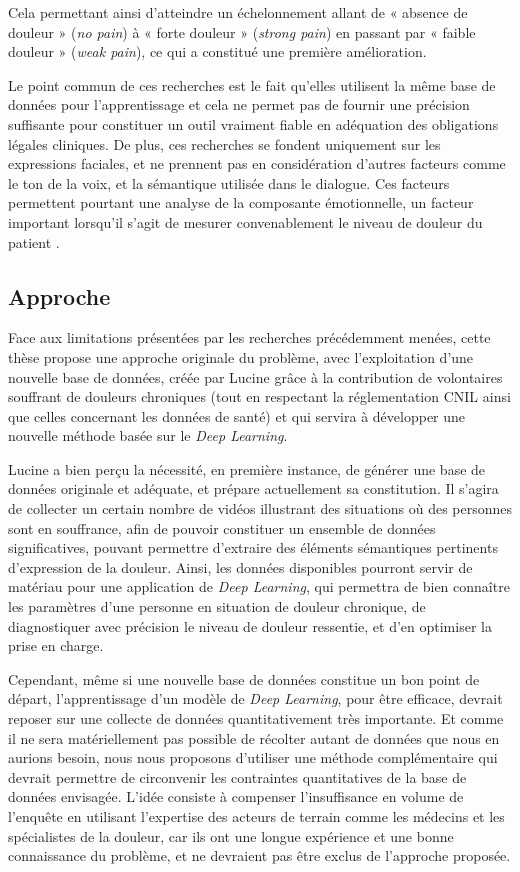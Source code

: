 \documentclass[french]{article}
\begin{document}
Cela  permettant  ainsi d’atteindre un échelonnement allant de « absence de
douleur » (\emph{no pain}) à « forte douleur » (\emph{strong pain}) en  passant par «
faible douleur » (\emph{weak pain}), ce qui a constitué une première amélioration.


Le point commun de ces recherches est le fait qu’elles utilisent la même base de
données pour l’apprentissage et cela ne permet pas de fournir une précision
suffisante pour constituer un outil vraiment fiable en adéquation des
obligations légales cliniques. De plus, ces recherches se fondent uniquement sur
les expressions faciales, et ne prennent pas en considération d’autres facteurs
comme le ton de la voix, et la sémantique utilisée dans le dialogue. Ces
facteurs permettent pourtant une analyse de la composante émotionnelle, un facteur
important lorsqu’il s’agit de mesurer convenablement le niveau de douleur du
patient \cite{hale1997emotional}.

\subsection{Approche}
\label{sec:orgcad02fb}

Face aux limitations présentées par les recherches précédemment menées, cette
thèse propose une approche originale du problème, avec l'exploitation
d’une nouvelle base de données, créée par Lucine grâce à la contribution de volontaires
souffrant de douleurs chroniques (tout en respectant la réglementation CNIL
ainsi que celles concernant les données de santé) et qui servira à
développer une nouvelle méthode basée sur le \emph{Deep Learning}.

Lucine a bien perçu la nécessité, en première instance, de générer une base de
données originale et adéquate, et prépare actuellement sa constitution. Il
s’agira de collecter un certain nombre de vidéos illustrant des situations où
des personnes sont en souffrance, afin de pouvoir constituer un ensemble de
données significatives, pouvant permettre d’extraire des éléments sémantiques
pertinents d’expression de la douleur. Ainsi, les données disponibles pourront
servir de matériau pour une application de \emph{Deep Learning}, qui permettra de bien
connaître les paramètres d’une personne en situation de douleur chronique, de
diagnostiquer avec précision le niveau de douleur ressentie, et d’en optimiser
la prise en charge.

Cependant, même si une nouvelle base de données constitue un bon point de
départ, l’apprentissage d’un modèle de \emph{Deep Learning}, pour être efficace,
devrait reposer sur une collecte de données quantitativement très importante. Et
comme il ne sera matériellement pas possible de récolter autant de données que
nous en aurions besoin, nous nous proposons d’utiliser une méthode
complémentaire qui devrait permettre de circonvenir les contraintes
quantitatives de la base de données envisagée. L’idée consiste à compenser
l’insuffisance en volume de l’enquête en utilisant l’expertise des acteurs de
terrain comme les médecins et les spécialistes de la douleur, car ils ont une
longue expérience et une bonne connaissance du problème, et ne devraient pas
être exclus de l’approche proposée.
\end{document}
